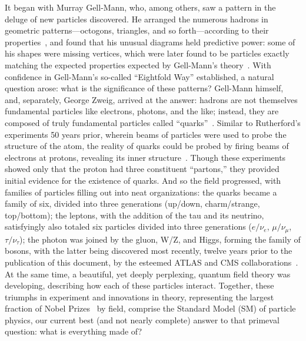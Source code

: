 \begin{dissertationintroduction}
It began with Murray Gell-Mann, who, among others, saw a pattern in the deluge of new particles discovered. 
He arranged the numerous hadrons in geometric patterns---octogons, triangles, and so forth---according to their properties~\cite{Gell-Mann:1961omu}, and found that his unusual diagrams held predictive power: some of his shapes were missing vertices, which were later found to be particles exactly matching the expected properties expected by Gell-Mann's theory~\cite{PhysRevLett.12.204}. 
With confidence in Gell-Mann's so-called ``Eightfold Way'' established, a natural question arose: what is the significance of these patterns? 
Gell-Mann himself, and, separately, George Zweig, arrived at the answer: hadrons are not themselves fundamental particles like electrons, photons, and the like; instead, they are composed of truly fundamental particles called ``quarks''~\cite{Lichtenberg:784713}.
Similar to Rutherford's experiments 50 years prior, wherein beams of particles were used to probe the structure of the atom, the reality of quarks could be probed by firing beams of electrons at protons, revealing its inner structure~\cite{PhysRevLett.23.930, PhysRevLett.23.935}. 
Though these experiments showed only that the proton had three constituent ``partons,'' they provided initial evidence for the existence of quarks.
And so the field progressed, with families of particles filling out into neat organizations: 
the quarks became a family of six, divided into three generations (up/down, charm/strange, top/bottom); %
the leptons, with the addition of the tau and its neutrino, satisfyingly also totaled six particles divided into three generations ($e/\nu_e$, $\mu/\nu_\mu$, $\tau/\nu_\tau$); %
the photon was joined by the gluon, W/Z, and Higgs, forming the family of bosons, with the latter being discovered most recently, twelve years prior to the publication of this document, by the esteemed ATLAS and CMS collaborations~\cite{ATLASdisc, CMSdisc}. %
At the same time, a beautiful, yet deeply perplexing, quantum field theory was developing, describing how each of these particles interact. 
Together, these triumphs in experiment and innovations in theory, representing the largest fraction of Nobel Prizes~\cite{ParticleNobels} by field, comprise the Standard Model (SM) of particle physics, our current best (and not nearly complete) answer to that primeval question: what is everything made of? 


\end{dissertationintroduction}
